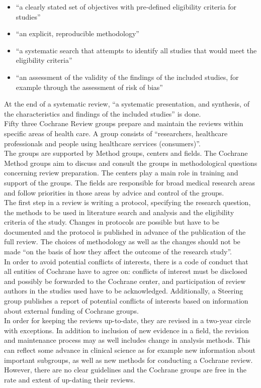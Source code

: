 \documentclass[11pt,a4paper,twoside]{book}\usepackage[]{graphicx}\usepackage[]{color}
\begin{document}
\begin{itemize}
\item``a clearly stated set of objectives with pre-defined eligibility criteria for studies''
\item ``an explicit, reproducible methodology''
\item ``a systematic search that attempts to identify all studies that would meet the eligibility criteria''
\item ``an assessment of the validity of the findings of the included studies, for example through the assessment of risk of bias''
\end{itemize}

At the end of a systematic review, ``a systematic presentation, and synthesis, of the characteristics and findings of the included studies'' is done. \\
Fifty three Cochrane Review groups prepare and maintain the reviews within specific areas of health care. A group consists of ``researchers, healthcare professionals and people using healthcare services (consumers)''. \\
The groups are supported by Method groups, centers and fields. The Cochrane Method groups aim to discuss and consult the groups in methodological questions concerning review preparation. The centers play a main role in training and support of the groups. The fields are responsible for broad medical research areas and follow priorities in those areas by advice and control of the groups. \\
The first step in a review is writing a protocol, specifying the research question, the methods to be used in literature search and analysis and the eligibility criteria of the study. Changes in protocols are possible but have to be documented and the protocol is published in advance of the publication of the full review. The choices of methodology as well as the changes should not be made ``on the basis of how they affect the outcome of the research study''. \\
In order to avoid potential conflicts of interests, there is a code of conduct that all entities of Cochrane have to agree on: conflicts of interest must be disclosed and possibly be forwarded to the Cochrane center, and participation of review authors in the studies used have to be acknowledged. Additionally, a Steering group publishes a report of potential conflicts of interests based on information about external funding of Cochrane groups. \\
In order for keeping the reviews up-to-date, they are revised in a two-year circle with exceptions. In addition to inclusion of new evidence in a field, the revision and maintenance process may as well includes change in analysis methods. This can reflect some advance in clinical science as for example new information about important subgroups, as well as new methods for conducting a Cochrane review. However, there are no clear guidelines and the Cochrane groups are free in the rate and extent of up-dating their reviews.
\end{document}
